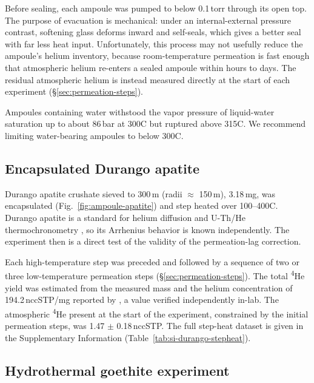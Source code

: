 Before sealing, each ampoule was pumped to below 0.1\,torr through its open top. The purpose of evacuation is mechanical: under an internal-external pressure contrast, softening glass deforms inward and self-seals, which gives a better seal with far less heat input. Unfortunately, this process may not usefully reduce the ampoule's helium inventory, because room-temperature permeation is fast enough that atmospheric helium re-enters a sealed ampoule within hours to days. The residual atmospheric helium is instead measured directly at the start of each experiment (\S\ref{sec:permeation-steps}).

Ampoules containing water withstood the vapor pressure of liquid-water saturation up to about 86\,bar at 300\textdegree C \citep{haar1984} but ruptured above 315\textdegree C. We recommend limiting water-bearing ampoules to below 300\textdegree C.

\subsection{Encapsulated Durango apatite}\label{sec:methods-apatite}

Durango apatite crushate sieved to 300\,\textmu m (radii $\approx$ 150\,\textmu m), 3.18\,mg, was encapsulated (Fig.~\ref{fig:ampoule-apatite}) and step heated over 100--400\textdegree C. Durango apatite is a standard for helium diffusion and U-Th/He thermochronometry \citep{zeitler1987,wolf1996,farley2000,shuster2005,shuster2006,flowers2007}, so its Arrhenius behavior is known independently. The experiment then is a direct test of the validity of the permeation-lag correction.

Each high-temperature step was preceded and followed by a sequence of two or three low-temperature permeation steps (\S\ref{sec:permeation-steps}). The total \textsuperscript{4}He yield was estimated from the measured mass and the helium concentration of 194.2\,nccSTP/mg reported by \citet{farley2000}, a value verified independently in-lab. The atmospheric \textsuperscript{4}He present at the start of the experiment, constrained by the initial permeation steps, was 1.47 $\pm$ 0.18\,nccSTP. The full step-heat dataset is given in the Supplementary Information (Table~\ref{tab:si-durango-stepheat}).

\subsection{Hydrothermal goethite experiment}\label{sec:methods-goethite}

